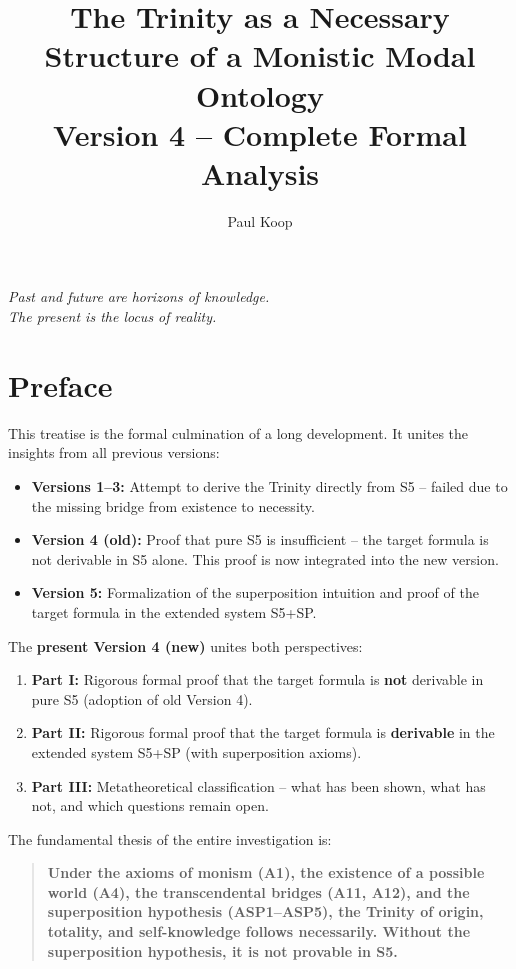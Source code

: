 \documentclass[
]{article}
\title{The Trinity as a Necessary Structure of a Monistic Modal Ontology \\ \large Version 4 – Complete Formal Analysis}
\author{Paul Koop}
\date{}
\begin{document}
\maketitle

\begin{center}
\emph{Past and future are horizons of knowledge. \\ The present is the locus of reality.}
\end{center}

\newpage
{
\setcounter{tocdepth}{3}
\tableofcontents
}
\newpage

\section{Preface}

This treatise is the formal culmination of a long development. It unites the insights from all previous versions:

\begin{itemize}
\item \textbf{Versions 1–3:} Attempt to derive the Trinity directly from S5 – failed due to the missing bridge from existence to necessity.
\item \textbf{Version 4 (old):} Proof that pure S5 is insufficient – the target formula is not derivable in S5 alone. This proof is now integrated into the new version.
\item \textbf{Version 5:} Formalization of the superposition intuition and proof of the target formula in the extended system S5+SP.
\end{itemize}

The \textbf{present Version 4 (new)} unites both perspectives:

\begin{enumerate}
\item \textbf{Part I:} Rigorous formal proof that the target formula is \textbf{not} derivable in pure S5 (adoption of old Version 4).
\item \textbf{Part II:} Rigorous formal proof that the target formula is \textbf{derivable} in the extended system S5+SP (with superposition axioms).
\item \textbf{Part III:} Metatheoretical classification – what has been shown, what has not, and which questions remain open.
\end{enumerate}

The fundamental thesis of the entire investigation is:

\begin{quote}
\textbf{Under the axioms of monism (A1), the existence of a possible world (A4), the transcendental bridges (A11, A12), and the superposition hypothesis (ASP1–ASP5), the Trinity of origin, totality, and self-knowledge follows necessarily. Without the superposition hypothesis, it is not provable in S5.}
\end{quote}
\end{document}
